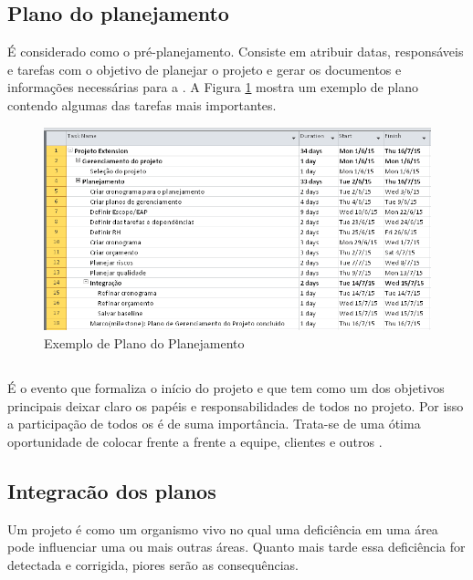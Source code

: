 \subsection{Plano do planejamento}

É considerado como o pré-planejamento. Consiste em atribuir datas, responsáveis e tarefas com o objetivo de planejar o projeto e gerar os documentos e informações necessárias para a \kick. A Figura \ref{fig:plano:planejamento} mostra um exemplo de plano contendo algumas das tarefas mais importantes.

\begin{figure}[!h]
\centering
\includegraphics[scale=0.5]{Figuras/plano_planejamento.png}
\caption{Exemplo de Plano do Planejamento}
\label{fig:plano:planejamento}
\end{figure}

\subsection{\Kick}

É o evento que formaliza o início do projeto e que tem como um dos objetivos principais deixar claro os papéis e responsabilidades de todos no projeto. Por isso a participação de todos os \stake é de suma importância. Trata-se de uma ótima oportunidade de colocar frente a frente a equipe, clientes e outros \stake.

\subsection{Integracão dos planos}

Um projeto é como um organismo vivo no qual uma deficiência em uma área pode influenciar uma ou mais outras áreas. Quanto mais tarde essa deficiência for detectada e corrigida, piores serão as consequências.

